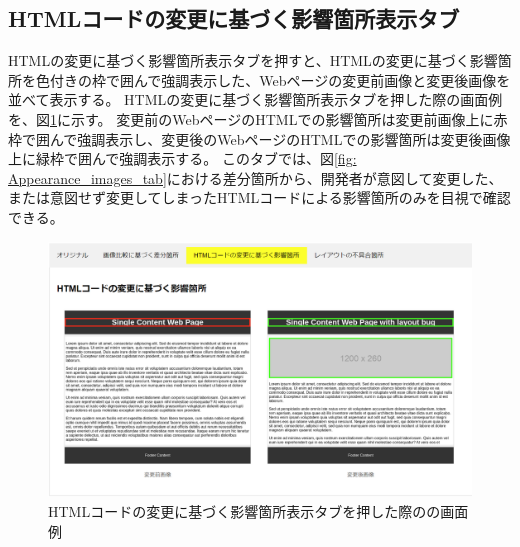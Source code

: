 \subsection{HTMLコードの変更に基づく影響箇所表示タブ}\label{subsec:html_tab}
HTMLの変更に基づく影響箇所表示タブを押すと、HTMLの変更に基づく影響箇所を色付きの枠で囲んで強調表示した、Webページの変更前画像と変更後画像を並べて表示する。
HTMLの変更に基づく影響箇所表示タブを押した際の画面例を、図\ref{fig: Appearance_html_tab}に示す。
変更前のWebページのHTMLでの影響箇所は変更前画像上に赤枠で囲んで強調表示し、変更後のWebページのHTMLでの影響箇所は変更後画像上に緑枠で囲んで強調表示する。
このタブでは、図\ref{fig: Appearance_images_tab}における差分箇所から、開発者が意図して変更した、または意図せず変更してしまったHTMLコードによる影響箇所のみを目視で確認できる。
\begin{figure}[tp]
    \begin{center}
        \includegraphics[width=1.0\columnwidth]{image/3_html_tab2.png}
        \caption{HTMLコードの変更に基づく影響箇所表示タブを押した際の\toolName の画面例}
        \label{fig: Appearance_html_tab}
    \end{center}
\end{figure}

